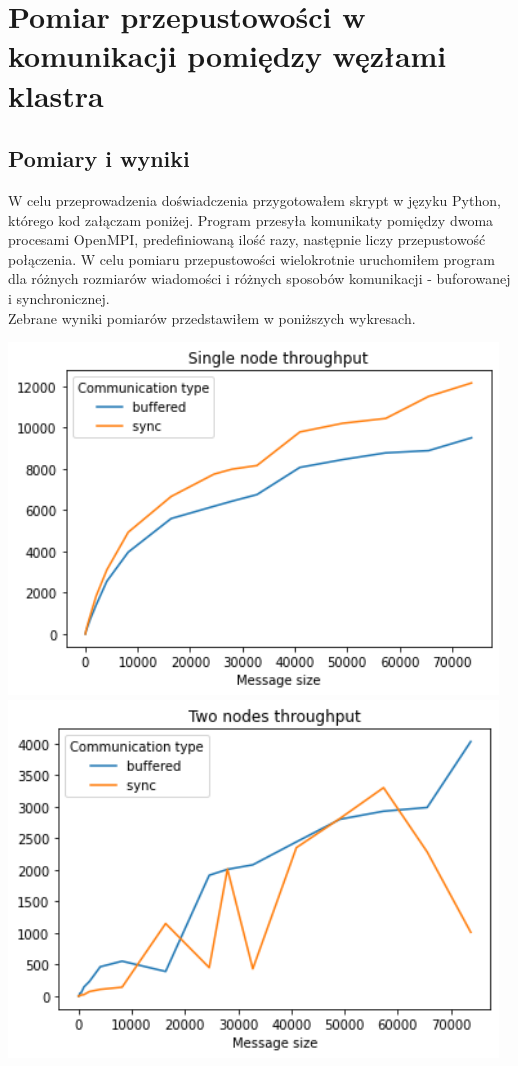 \documentclass{article}
\begin{document}
    \section{Pomiar przepustowości w komunikacji pomiędzy węzłami klastra}
        \subsection{Pomiary i wyniki}
        W celu przeprowadzenia doświadczenia przygotowałem skrypt w języku Python, którego kod załączam poniżej. Program przesyła komunikaty pomiędzy dwoma procesami OpenMPI, predefiniowaną ilość razy, następnie liczy przepustowość połączenia. W celu pomiaru przepustowości wielokrotnie uruchomiłem program dla różnych rozmiarów wiadomości i różnych sposobów komunikacji - buforowanej i synchronicznej. \\
        Zebrane wyniki pomiarów przedstawiłem w poniższych wykresach.
        \begin{center}
            \includegraphics[width=13cm]{report1/images/ex1_single_node.png}
            \includegraphics[width=13cm]{report1/images/ex1_two_nodes.png}
        \end{center}
\end{document}
